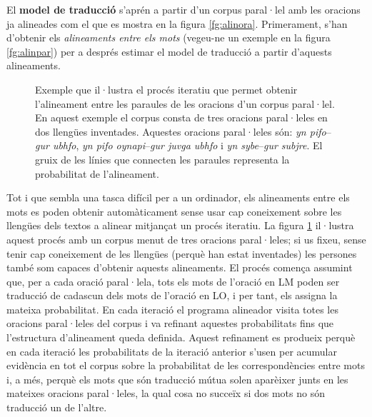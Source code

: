 El \textbf{model de traducció} s'aprén a partir d'un corpus paral·lel
amb les oracions ja alineades com el que es mostra en la figura
\ref{fg:alinora}. Primerament, s'han d'obtenir els \emph{alineaments
  entre els mots} (vegeu-ne un exemple en la figura \ref{fg:alinpar})
per a després estimar el model de traducció a partir d'aquests
alineaments.

\begin{figure}[tb]
  \centering %



  \caption{Exemple que il·lustra el procés iteratiu que permet obtenir
    l'alineament entre les paraules de les oracions d'un corpus
    paral·lel. En aquest exemple el corpus consta de tres oracions
    paral·leles en dos llengües inventades. Aquestes oracions
    paral·leles són: \emph{yn pifo}--\emph{gur ubhfo}, \emph{yn pifo
      oynapi}--\emph{gur juvga ubhfo} i \emph{yn sybe}--\emph{gur
      subjre}. El gruix de les línies que connecten les paraules
    representa la probabilitat de l'alineament.}
\label{fg:pasosalin}
\end{figure}

Tot i que sembla una tasca difícil per a un ordinador, els alineaments
entre els mots es poden obtenir automàticament sense usar cap
coneixement sobre les llengües dels textos a alinear mitjançat un
procés iteratiu. La figura \ref{fg:pasosalin} il·lustra aquest procés
amb un corpus menut de tres oracions paral·leles; si us fixeu, sense
tenir cap coneixement de les llengües (perquè han estat inventades)
les persones també som capaces d'obtenir aquests alineaments. El
procés comença assumint que, per a cada oració paral·lela, tots els
mots de l'oració en LM poden ser traducció de cadascun dels mots de
l'oració en LO, i per tant, els assigna la mateixa probabilitat.  En
cada iteració el programa alineador visita totes les oracions
paral·leles del corpus i va refinant aquestes probabilitats fins que
l'estructura d'alineament queda definida. Aquest refinament es
produeix perquè en cada iteració les probabilitats de la iteració
anterior s'usen per acumular evidència en tot el corpus sobre la
probabilitat de les correspondències entre mots i, a més, perquè els
mots que són traducció mútua solen aparèixer junts en les mateixes
oracions paral·leles, la qual cosa no succeïx si dos mots no són
traducció un de l'altre.

